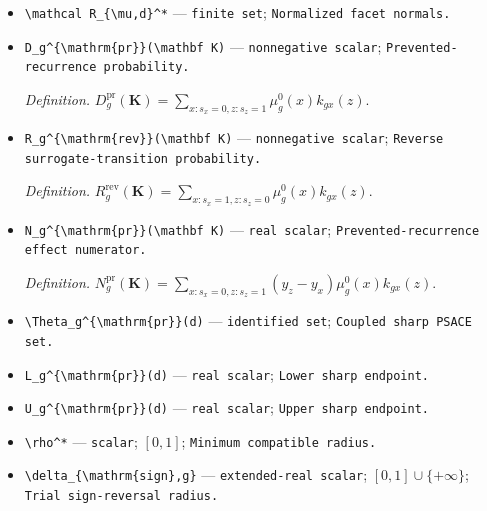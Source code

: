 \documentclass{article}
\begin{document}
\begin{itemize}
  \item \texttt{\textbackslash{}\allowbreak{}mathcal R\_\allowbreak{}\{\textbackslash{}\allowbreak{}mu,\allowbreak{}d\}\allowbreak{}\textasciicircum{}*} --- \texttt{finite set}; \texttt{Normalized facet normals.}
  \item \texttt{D\_\allowbreak{}g\textasciicircum{}\{\textbackslash{}\allowbreak{}mathrm\{pr\}\allowbreak{}\}\allowbreak{}(\textbackslash{}\allowbreak{}mathbf K)} --- \texttt{nonnegative scalar}; \texttt{Prevented-\allowbreak{}recurrence probability.}
  \par\smallskip\noindent\emph{Definition.} \(D_g^{\mathrm{pr}}(\mathbf K)=\sum_{x:s_x=0,z:s_z=1}\mu_g^0(x)k_{gx}(z)\).
  \item \texttt{R\_\allowbreak{}g\textasciicircum{}\{\textbackslash{}\allowbreak{}mathrm\{rev\}\allowbreak{}\}\allowbreak{}(\textbackslash{}\allowbreak{}mathbf K)} --- \texttt{nonnegative scalar}; \texttt{Reverse surrogate-\allowbreak{}transition probability.}
  \par\smallskip\noindent\emph{Definition.} \(R_g^{\mathrm{rev}}(\mathbf K)=\sum_{x:s_x=1,z:s_z=0}\mu_g^0(x)k_{gx}(z)\).
  \item \texttt{N\_\allowbreak{}g\textasciicircum{}\{\textbackslash{}\allowbreak{}mathrm\{pr\}\allowbreak{}\}\allowbreak{}(\textbackslash{}\allowbreak{}mathbf K)} --- \texttt{real scalar}; \texttt{Prevented-\allowbreak{}recurrence effect numerator.}
  \par\smallskip\noindent\emph{Definition.} \(N_g^{\mathrm{pr}}(\mathbf K)=\sum_{x:s_x=0,z:s_z=1}(y_z-y_x)\mu_g^0(x)k_{gx}(z)\).
  \item \texttt{\textbackslash{}\allowbreak{}Theta\_\allowbreak{}g\textasciicircum{}\{\textbackslash{}\allowbreak{}mathrm\{pr\}\allowbreak{}\}\allowbreak{}(d)} --- \texttt{identified set}; \texttt{Coupled sharp PSACE set.}
  \item \texttt{L\_\allowbreak{}g\textasciicircum{}\{\textbackslash{}\allowbreak{}mathrm\{pr\}\allowbreak{}\}\allowbreak{}(d)} --- \texttt{real scalar}; \texttt{Lower sharp endpoint.}
  \item \texttt{U\_\allowbreak{}g\textasciicircum{}\{\textbackslash{}\allowbreak{}mathrm\{pr\}\allowbreak{}\}\allowbreak{}(d)} --- \texttt{real scalar}; \texttt{Upper sharp endpoint.}
  \item \texttt{\textbackslash{}\allowbreak{}rho\textasciicircum{}*} --- \texttt{scalar}; \([0,1]\); \texttt{Minimum compatible radius.}
  \item \texttt{\textbackslash{}\allowbreak{}delta\_\allowbreak{}\{\textbackslash{}\allowbreak{}mathrm\{sign\}\allowbreak{},\allowbreak{}g\}\allowbreak{}} --- \texttt{extended-\allowbreak{}real scalar}; \([0,1]\cup\{+\infty\}\); \texttt{Trial sign-\allowbreak{}reversal radius.}

\end{itemize}
\end{document}

